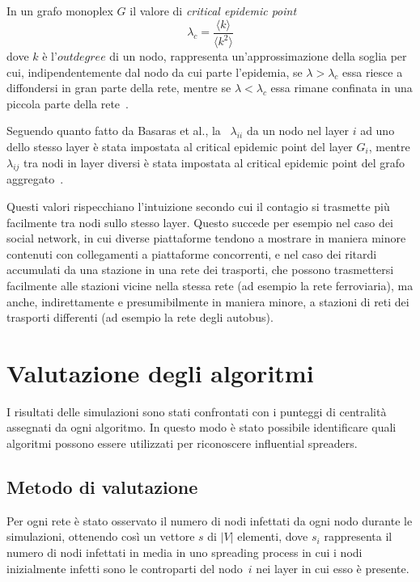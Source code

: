 In un grafo monoplex $G$ il valore di \emph{critical epidemic point}
\begin{equation*}
    \lambda_c = \frac{\langle k  \rangle}{\langle k^2 \rangle}
\end{equation*}
dove $k$ è l'$\mathit{outdegree}$ di un nodo, rappresenta un'approssimazione della soglia per 
cui, indipendentemente dal nodo da cui parte l'epidemia, se $\lambda > \lambda_c$ essa riesce 
a diffondersi in gran parte della rete, mentre se $\lambda < \lambda_c$ essa rimane confinata 
in una piccola parte della rete~\cite{saumell:epidemicsp}.

Seguendo quanto fatto da Basaras et al., la \epprob\ $\lambda_{ii}$ da un nodo nel 
layer $i$ ad uno dello stesso layer è stata impostata al critical epidemic point del layer $G_i$, 
mentre $\lambda_{ij}$ tra nodi in layer diversi è stata impostata al critical epidemic point del grafo 
aggregato~\cite{basaras:infspmul}. 

Questi valori rispecchiano l'intuizione secondo cui il contagio si trasmette 
più facilmente tra nodi sullo stesso layer. Questo succede per esempio nel caso dei social 
network, in cui diverse piattaforme tendono a mostrare in maniera minore contenuti con
collegamenti a piattaforme concorrenti, e nel caso dei ritardi accumulati da 
una stazione in una rete dei trasporti, che possono trasmettersi facilmente alle stazioni vicine 
nella stessa rete (ad esempio la rete ferroviaria), ma anche, indirettamente e presumibilmente in maniera
minore, a stazioni di reti dei trasporti differenti (ad esempio la rete degli autobus).

\section{Valutazione degli algoritmi}
I risultati delle simulazioni sono stati confrontati con i punteggi di centralità
assegnati da ogni algoritmo. In questo modo è stato possibile identificare quali algoritmi 
possono essere utilizzati per riconoscere influential spreaders.

\subsection{Metodo di valutazione}
Per ogni rete è stato osservato il numero di nodi infettati da ogni nodo durante le simulazioni, 
ottenendo così un vettore $s$ di $|V|$ elementi, dove $s_i$ rappresenta il numero di nodi 
infettati in media in uno spreading process in cui i nodi inizialmente infetti sono le controparti del 
nodo~$i$ nei layer in cui esso è presente.

